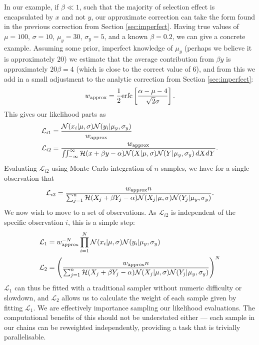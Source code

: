 \documentclass[a4paper,fleqn,usenatbib]{mnras}
\begin{document}
In our example, if $\beta \ll 1$, such that the majority of selection effect is encapsulated by $x$ and not $y$, our approximate correction can take the form found in the previous correction from Section \ref{sec:imperfect}. Having true values of $\mu = 100$, $\sigma = 10$, $\mu_y = 30$, $\sigma_y = 5$, and a known $\beta = 0.2$, we can give a concrete example. Assuming some prior, imperfect knowledge of $\mu_y$ (perhaps we believe it is approximately $20$) we estimate that the average contribution from $\beta y$ is approximately $20\beta = 4$ (which is close to the correct value of $6$), and from this we add in a small adjustment to the analytic correction from Section \ref{sec:imperfect}:
\begin{align}
w_{\rm approx} = \frac{1}{2} {\rm erfc}\left[ \frac{\alpha - \mu - 4}{\sqrt{2}\sigma} \right].
\end{align}
This gives our likelihood parts as
\begin{align}
\mathcal{L}_{i1} &= \frac{ \mathcal{N}(x_i|\mu, \sigma) \mathcal{N}(y_i|\mu_y, \sigma_y)}{w_{\rm approx} } \\
\mathcal{L}_{i2} &= \frac{ w_{\rm approx}  }{\iint_{-\infty}^\infty \mathcal{H}(x + \beta y - \alpha) \mathcal{N}(X|\mu, \sigma) \mathcal{N}(Y|\mu_y, \sigma_y)\, dX dY}.
\end{align}
Evaluating $\mathcal{L}_{i2}$ using Monte Carlo integration of $n$ samples, we have for a single observation that
\begin{align}
\mathcal{L}_{i2} = \frac{ w_{\rm approx}  n }{\sum_{j=1}^{n} \mathcal{H}(X_j + \beta Y_j - \alpha) \mathcal{N}(X_j|\mu, \sigma) \mathcal{N}(Y_j|\mu_y, \sigma_y)} \label{eq:mc}.
\end{align}
We now wish to move to a set of observations. As $\mathcal{L}_{i2}$ is independent of the specific observation $i$, this is a simple step:
\begin{align}
\mathcal{L}_1 &= w_{\rm approx}^{-N} \prod_{i=1}^N \mathcal{N}(x_i|\mu, \sigma) \mathcal{N}(y_i|\mu_y, \sigma_y) \\
\mathcal{L}_{2} &= \left(  \frac{ w_{\rm approx}  n }{\sum_{j=1}^{n} \mathcal{H}(X_j + \beta Y_j - \alpha) \mathcal{N}(X_j|\mu, \sigma) \mathcal{N}(Y_j|\mu_y, \sigma_y)}\right)^N
\end{align}
$\mathcal{L}_1$ can thus be fitted with a traditional sampler without numeric difficulty or slowdown, and $\mathcal{L}_2$ allows us to calculate the weight of each sample given by fitting $\mathcal{L}_{1}$. We are effectively importance sampling our likelihood evaluations. The computational benefits of this should not be understated either --- each sample in our chains can be reweighted independently, providing a task that is trivially parallelisable. 
\end{document}
